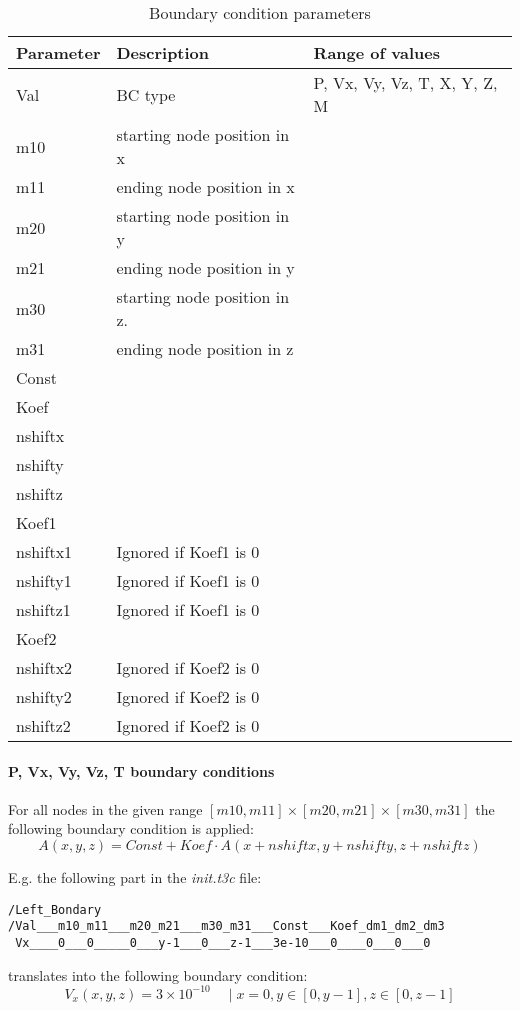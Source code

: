 \begin{table}[H]
\small
\centering
\begin{tabular}{l l l}
\toprule
Parameter & Description & Range of values \\
\midrule
Val & BC type & P, Vx, Vy, Vz, T, X, Y, Z, M \\
m10 & starting node position in x &  \\ 
m11 & ending node position in x &  \\ 
m20 & starting node position in y &  \\ 
m21 & ending node position in y &  \\ 
m30 & starting node position in z. &  \\ 
m31 & ending node position in z &  \\ 
Const &  &  \\ 
Koef &  &  \\ 
nshiftx &  &  \\ 
nshifty &  &  \\ 
nshiftz &  &  \\ 
Koef1 &  &  \\ 
nshiftx1 & Ignored if Koef1 is 0 &  \\ 
nshifty1 & Ignored if Koef1 is 0 &  \\ 
nshiftz1 & Ignored if Koef1 is 0 &  \\ 
Koef2 &  &  \\ 
nshiftx2 & Ignored if Koef2 is 0 &  \\ 
nshifty2 & Ignored if Koef2 is 0 &  \\ 
nshiftz2 & Ignored if Koef2 is 0 &  \\ 
\bottomrule
\end{tabular}
\caption{Boundary condition parameters}
\label{tbl:BC_parameters}
\end{table}

\paragraph{P, Vx, Vy, Vz, T boundary conditions}
For all nodes in the given range $[m10,m11]\times[m20,m21]\times[m30,m31]$ the following boundary condition is applied:
\begin{equation}\label{eqs:PVT_BC_general}
A(x,y,z) = Const + Koef \cdot A(x+nshiftx,y+nshifty,z+nshiftz)
\end{equation}

E.g. the following part in the \textit{init.t3c} file:
\begin{lstlisting}
/Left_Bondary
/Val___m10_m11___m20_m21___m30_m31___Const___Koef_dm1_dm2_dm3
 Vx____0___0_____0___y-1___0___z-1___3e-10___0____0___0___0
\end{lstlisting}
translates into the following boundary condition:
\begin{equation}
V_x(x,y,z) = 3\times10^{-10} \quad \mid x=0, y\in[0,y-1], z\in[0,z-1]
\end{equation}

